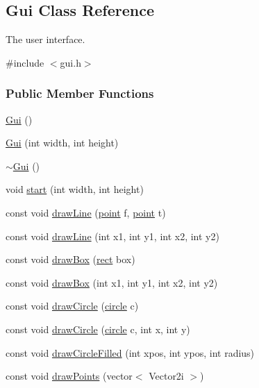 \hypertarget{classGui}{\subsection{\-Gui \-Class \-Reference}
\label{classGui}
}


\-The user interface.  




{\ttfamily \#include $<$gui.\-h$>$}

\subsubsection*{\-Public \-Member \-Functions}
\begin{DoxyCompactItemize}
\item 
\hyperlink{classGui_ab2655dbb6d3a91d7e90cb83dad6c0450}{\-Gui} ()
\item 
\hyperlink{classGui_af1c8c5496c641bf4bd8c0780fb3cc781}{\-Gui} (int width, int height)
\item 
\hyperlink{classGui_a4fd8485d226f9b8a2ac2d81d7f0f3598}{$\sim$\-Gui} ()
\item 
void \hyperlink{classGui_ab22584cbddc02490c1737caf6e20ee5a}{start} (int width, int height)
\item 
const void \hyperlink{classGui_a22030a241ba6e5ba6cbbc280da4a1d06}{draw\-Line} (\hyperlink{structpoint}{point} f, \hyperlink{structpoint}{point} t)
\item 
const void \hyperlink{classGui_aaac1baf43d5d651a1793af86073244c2}{draw\-Line} (int x1, int y1, int x2, int y2)
\item 
const void \hyperlink{classGui_afb53d164f934b70952fdb08334ef6e55}{draw\-Box} (\hyperlink{structrect}{rect} box)
\item 
const void \hyperlink{classGui_a88dc6f9d334da3e0c842260883ac679d}{draw\-Box} (int x1, int y1, int x2, int y2)
\item 
const void \hyperlink{classGui_a3507ef363af011a7d190373568246b5c}{draw\-Circle} (\hyperlink{structcircle}{circle} c)
\item 
const void \hyperlink{classGui_a9516c3534860be388decd0a1359b77a6}{draw\-Circle} (\hyperlink{structcircle}{circle} c, int x, int y)
\item 
const void \hyperlink{classGui_a162fc4d49a18dd268c650301b44c58c0}{draw\-Circle\-Filled} (int xpos, int ypos, int radius)
\item 
const void \hyperlink{classGui_a49607add54d254a375a67626aea14874}{draw\-Points} (vector$<$ \-Vector2i $>$)
\item 

\end{DoxyCompactItemize}
